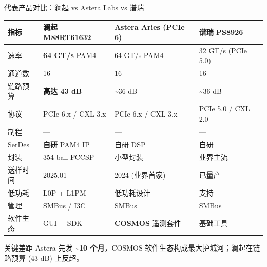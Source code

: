 \documentclass[aspectratio=169, 10pt, UTF8]{ctexbeamer}
\begin{document}
\begin{frame}{代表产品对比：澜起 vs Astera Labs vs 谱瑞}
  \centering
  \footnotesize
  \begin{tabularx}{\textwidth}{p{2.4cm} X X X}
    \toprule
    \textbf{指标} & \textbf{澜起 M88RT61632} & \textbf{Astera Aries (PCIe 6)} & \textbf{谱瑞 PS8926} \\
    \midrule
    速率      & \textbf{64 GT/s} PAM4     & 64 GT/s PAM4               & 32 GT/s (PCIe 5.0) \\
    通道数    & 16                        & 16                         & 16 \\
    链路预算  & \textbf{高达 43 dB}        & \textasciitilde36 dB        & \textasciitilde36 dB \\
    协议      & PCIe 6.x / CXL 3.x        & PCIe 6.x / CXL 3.x         & PCIe 5.0 / CXL 2.0 \\
    制程      & —                         & —                          & — \\
    SerDes    & \textbf{自研} PAM4 IP       & 自研 DSP                    & 自研 \\
    封装      & 354-ball FCCSP             & 小型封装                     & 业界主流 \\
    送样时间  & 2025.01                   & 2024 (业界首家)              & 已量产 \\
    低功耗    & L0P + L1PM                & 低功耗设计                   & 支持 \\
    管理      & SMBus / I3C              & SMBus                       & SMBus \\
    软件生态  & GUI + SDK                & \textbf{COSMOS} 遥测套件     & 基础工具 \\
    \bottomrule
  \end{tabularx}

  \vspace{6pt}
  \begin{alertblock}{关键差距}
    Astera 先发 \textbf{\textasciitilde10 个月}，COSMOS 软件生态构成最大护城河；澜起在链路预算 (43 dB) 上反超。
  \end{alertblock}
\end{frame}
\end{document}
